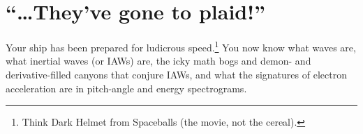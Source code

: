 














\section{``\dots They've gone to plaid!''}

Your ship has been prepared for ludicrous speed.\footnote{Think Dark Helmet from
  Spaceballs (the movie, not the cereal).} You now know what \Alf
waves are, what inertial \Alf waves (or IAWs) are, the icky math bogs and demon-
and derivative-filled canyons that conjure IAWs, and what the signatures of
\Alfic electron acceleration are in pitch-angle and energy spectrograms.

